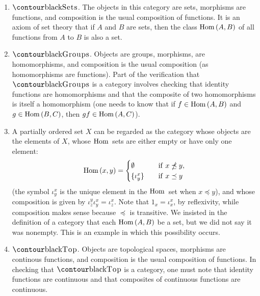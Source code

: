     \begin{example}\label{ex:categories}
        \phantom{a}
        \begin{enumerate}[label = (\arabic*)]
            \item $\cSets$. The objects in this category are sets, morphisms are functions, and composition is the usual composition of functions. It is an axiom of set theory that if $A$ and $B$ are sets, then the class $\operatorname{Hom}{(A,B)}$ of all functions from $A$ to $B$ is also a set.

            \item $\cGroups$. Objects are groups, morphisms, are homomorphisms, and composition is the usual composition (as homomorphisms are functions). Part of the verification that $\cGroups$ is a category involves checking that identity functions are homomorphisms and that the composite of two homomorphisms is itself a homomorphism (one needs to know that if $f \in \operatorname{Hom}{(A,B)}$ and $g \in \operatorname{Hom}{(B,C)}$, then $gf \in \operatorname{Hom}{(A,C)}$).

            \item A partially ordered set $X$ can be regarded as the category whose objects are the elements of $X$, whose $\operatorname{Hom}{}$ sets are either empty or have only one element:
                \begin{equation*}
                \operatorname{Hom}{(x,y)} = 
                    \begin{cases} 
                        \emptyset & \quad \text{if}\hskip0.4em\relax x\npreceq y, \\
                        \{\iota^{x}_{y}\} & \quad \text{if}\hskip0.4em\relax x\preceq y \\ 
                    \end{cases}
                \end{equation*}
            (the symbol $\iota^{x}_{y}$ is the unique element in the $\operatorname{Hom}{}$ set when $x \preceq y$), and whose composition is given by $\iota^{y}_{z} \iota^{x}_{y} = \iota^{x}_{z}$. Note that $1_x = \iota^{x}_{x}$, by reflexivity, while composition makes sense because $\preceq$ is transitive. We insisted in the definition of a category that each $\operatorname{Hom}{(A,B)}$ be a set, but we did not say it was nonempty. This is an example in which this possibility occurs.

            \item $\cTop$. Objects are topological spaces, morphisms are continous functions, and composition is the usual composition of functions. In checking that $\cTop$ is a category, one must note that identity functions are continuous and that composites of continuous functions are continuous.


\end{enumerate}
\end{example}
